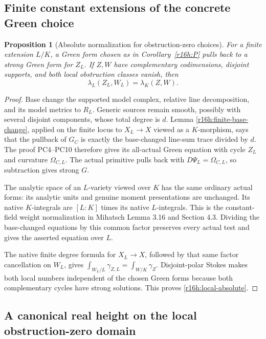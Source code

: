 \documentclass[11pt,a4paper]{article}
\newtheorem{proposition}[theorem]{Proposition}
\theoremstyle{definition}
\theoremstyle{remark}
\numberwithin{equation}{section}
\begin{document}
\subsection{Finite constant extensions of the concrete Green choice}

\begin{proposition}[Absolute normalization for obstruction-zero choices]
\label{r16h:constant-extension}
For a finite extension $L/K$, a Green form chosen as in
Corollary~\ref{r16h:P} pulls back to a strong Green form for $Z_L$.
If $Z,W$ have complementary codimensions, disjoint supports, and both
local obstruction classes vanish, then
\[
                   \lambda_L(Z_L,W_L)=\lambda_K(Z,W).
 \tag{H16.8}\label{r16h:local-absolute}
\]
\end{proposition}

\begin{proof}
Base change the supported model complex, relative line decomposition,
and its model metrics to $R_L$. Generic sources remain smooth, possibly
with several disjoint components, whose total degree is $d$. Lemma
\ref{r16h:finite-base-change}, applied on the finite locus to
$X_L\to X$ viewed as a $K$-morphism, says that the pullback of $G_C$
is exactly the base-changed line-sum trace divided by $d$. The proof
PC4--PC10 therefore gives its all-actual Green equation with cycle
$Z_L$ and curvature $\Omega_{C,L}$. The actual primitive pulls back
with $D\Psi_L=\Omega_{C,L}$, so subtraction gives strong $G$.

The analytic space of an $L$-variety viewed over $K$ has the same
ordinary actual forms: its analytic units and genuine moment
presentations are unchanged. Its native $K$-integrals are $[L:K]$
times its native $L$-integrals. This is the constant-field weight
normalization in Mihatsch Lemma 3.16 and Section 4.3. Dividing the
base-changed equations by this common factor preserves every actual
test and gives the asserted equation over $L$.

The native finite degree formula for $X_L\to X$, followed by that
same factor cancellation on $W_L$, gives
$\int_{W_L/L}\gamma_{Z,L}=\int_{W/K}\gamma_Z$. Disjoint-polar
Stokes makes both local numbers independent of the chosen Green
forms because both complementary cycles have strong solutions. This
proves \eqref{r16h:local-absolute}.
\end{proof}

\subsection{A canonical real height on the local obstruction-zero domain}
\end{document}
